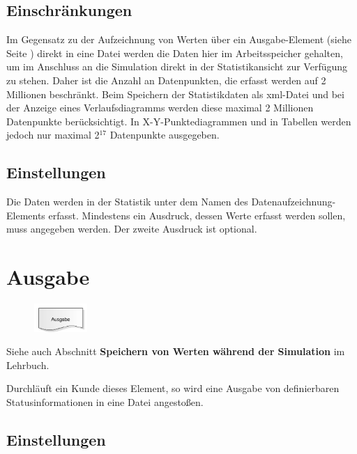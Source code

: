 \subsection*{Einschränkungen}

Im Gegensatz zu der Aufzeichnung von Werten über ein Ausgabe-Element (siehe Seite \pageref{ref:ModelElementOutput}) 
direkt in eine Datei werden die Daten hier im Arbeitsspeicher gehalten, um im Anschluss an die Simulation
direkt in der Statistikansicht zur Verfügung zu stehen. Daher ist die Anzahl an Datenpunkten, die erfasst
werden auf 2 Millionen beschränkt. Beim Speichern der Statistikdaten als xml-Datei und bei der Anzeige eines
Verlaufsdiagramms werden diese maximal 2 Millionen Datenpunkte berücksichtigt. In X-Y-Punktediagrammen und
in Tabellen werden jedoch nur maximal 2$^{17}$ Datenpunkte ausgegeben.

\subsection*{Einstellungen}

Die Daten werden in der Statistik unter dem Namen des Datenaufzeichnung-Elements erfasst. Mindestens
ein Ausdruck, dessen Werte erfasst werden sollen, muss angegeben werden. Der zweite Ausdruck ist
optional.


\section{Ausgabe}
\label{ref:ModelElementOutput}

\begin{figure}
\vspace{-22pt}
\includegraphics[width=2cm]{imageModelElementOutput.png}
\vspace{-22pt}
\end{figure}

Siehe auch Abschnitt \textbf{Speichern von Werten während der Simulation} im Lehrbuch.

Durchläuft ein Kunde dieses Element, so wird eine Ausgabe von definierbaren Statusinformationen in eine
Datei angestoßen.

\subsection*{Einstellungen}

